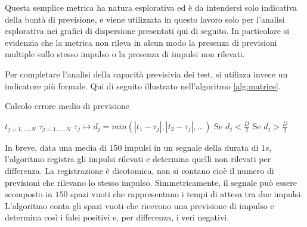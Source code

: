 \documentclass[9pt,twocolumn,twoside]{osajnl}
\begin{document}
Questa semplice metrica ha natura esplorativa ed è da intendersi solo indicativa della bontà di previsione, e viene utilizzata in questo lavoro solo per l'analisi esplorativa nei grafici di dispersione presentati qui di seguito. In particolare si evidenzia che la metrica non rileva in alcun modo la presenza di previsioni multiple sullo stesso impulso o la presenza di impulsi non rilevati.

Per completare l'analisi della capacità previsivia dei test, si utilizza invece un indicatore più formale. Qui di seguito illustrato nell'algoritmo \ref{alg:matrice}.

\begin{algorithm}
\caption{Calcolo errore medio di previsione}\label{alg:matrice}
\begin{algorithmic}[1]
\State $t_{j=1,...,N}$ 
\State $\tau_{j=1,...,N}$ 
\State $\tau_{j}\mapsto d_{j} = min( |t_{1}-\tau_{j}|, |t_{2}-\tau_{j}|, ...)$ 
\State Se $d_{j}<\frac{D}{2}$ 
\State Se $d_{j}>\frac{D}{2}$ 
\State  {}
\State  {}
\end{algorithmic}
\end{algorithm}

In breve, data una media di $150$ impulsi in un segnale della durata di $1s$, l'algoritmo registra gli impulsi rilevati e determina quelli non rilevati per differenza. La registrazione è dicotomica, non si contano cioè il numero di previsioni che rilevano lo stesso impulso. Simmetricamente, il segnale può essere scomposto in $150$ spazi vuoti che rappresentano i tempi di attesa tra due impulsi. L'algoritmo conta gli spazi vuoti che ricevono una previsione di impulso e determina così i falsi positivi e, per differenza, i veri negativi.
\end{document}
